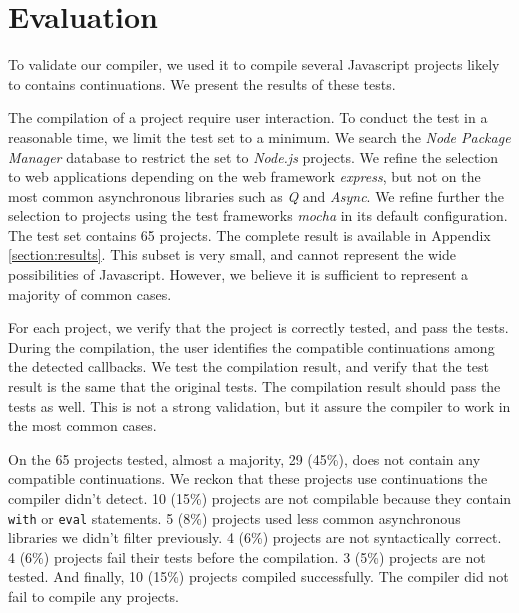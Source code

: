 \section{Evaluation} \label{section:evaluation}

To validate our compiler, we used it to compile several Javascript projects likely to contains continuations.
We present the results of these tests.


The compilation of a project require user interaction.
To conduct the test in a reasonable time, we limit the test set to a minimum.
We search the \textit{Node Package Manager} database to restrict the set to \textit{Node.js} projects.
We refine the selection to web applications depending on the web framework \textit{express}, but not on the most common asynchronous libraries such as \textit{Q} and \textit{Async}.
We refine further the selection to projects using the test frameworks \textit{mocha} in its default configuration.
The test set contains 65 projects.
The complete result is available in Appendix \ref{section:results}.
This subset is very small, and cannot represent the wide possibilities of Javascript.
However, we believe it is sufficient to represent a majority of common cases.


For each project, we verify that the project is correctly tested, and pass the tests.
During the compilation, the user identifies the compatible continuations among the detected callbacks.
We test the compilation result, and verify that the test result is the same that the original tests.
The compilation result should pass the tests as well.
This is not a strong validation, but it assure the compiler to work in the most common cases.


On the 65 projects tested, almost a majority, 29 (45\%), does not contain any compatible continuations.
We reckon that these projects use continuations the compiler didn't detect.
10 (15\%) projects are not compilable because they contain \texttt{with} or \texttt{eval} statements.
5 (8\%) projects used less common asynchronous libraries we didn't filter previously.
4 (6\%) projects are not syntactically correct.
4 (6\%) projects fail their tests before the compilation.
3 (5\%) projects are not tested.
And finally, 10 (15\%) projects compiled successfully.
The compiler did not fail to compile any projects.

